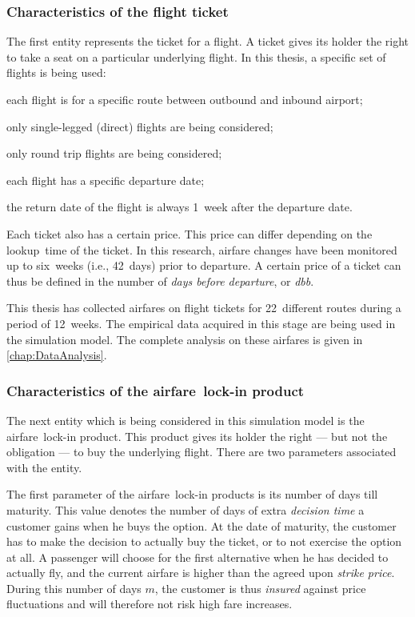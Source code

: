 \subsubsection{Characteristics of the flight ticket}
\label{sub:CharacteristicsOfTheFlightTicket}
The first entity represents the ticket for a flight. A ticket gives its holder the right to take a seat on a particular underlying flight. In this thesis, a specific set of flights is being used:

\begin{compactitem}
\item each flight is for a specific route between outbound and inbound airport;
\item only single-legged (direct) flights are being considered;
\item only round trip flights are being considered;
\item each flight has a specific departure date;
\item the return date of the flight is always 1~week after the departure date.
\end{compactitem}

Each ticket also has a certain price. This price can differ depending on the lookup~time of the ticket. In this research, airfare changes have been monitored up to six~weeks (i.e., 42~days) prior to departure. A certain price of a ticket can thus be defined in the number of \emph{days before departure}, or \emph{dbb}.

This thesis has collected airfares on flight tickets for 22~different routes during a period of 12~weeks. The empirical data acquired in this stage are being used in the simulation model. The complete analysis on these airfares is given in \autoref{chap:DataAnalysis}.

\subsubsection{Characteristics of the airfare~lock-in product}
The next entity which is being considered in this simulation model is the airfare~lock-in product. This product gives its holder the right --- but not the obligation --- to buy the underlying flight. There are two parameters associated with the entity.

The first parameter of the airfare~lock-in products is its number of days till maturity. This value denotes the number of days of extra \emph{decision time} a customer gains when he buys the option. At the date of maturity, the customer has to make the decision to actually buy the ticket, or to not exercise the option at all. A passenger will choose for the first alternative when he has decided to actually fly, and the current airfare is higher than the agreed upon \emph{strike price}. During this number of days $m$, the customer is thus \emph{insured} against price fluctuations and will therefore not risk high fare increases.


